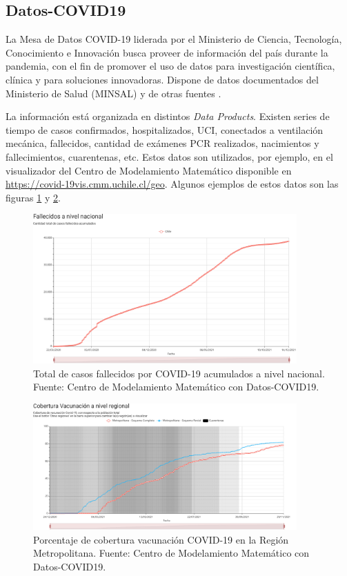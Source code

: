 \subsection{Datos-COVID19}\label{sec:datos-minsal}

La Mesa de Datos COVID-19 liderada por el Ministerio de Ciencia, Tecnología, Conocimiento e Innovación busca proveer de información del país durante la pandemia, con el fin de promover el uso de datos para investigación científica, clínica y para soluciones innovadoras. Dispone de datos documentados del Ministerio de Salud (MINSAL) y de otras fuentes \cite{MINCIENCIA}.

La información está organizada en distintos \textit{Data Products}. Existen series de tiempo de casos confirmados, hospitalizados, UCI, conectados a ventilación mecánica, fallecidos, cantidad de exámenes PCR realizados, nacimientos y fallecimientos, cuarentenas, etc. Estos datos son utilizados, por ejemplo, en el visualizador del Centro de Modelamiento Matemático disponible en \url{https://covid-19vis.cmm.uchile.cl/geo}. Algunos ejemplos de estos datos son las figuras \ref{img:cmm-fallecidos} y \ref{img:cmm-vacunados}.

\begin{figure}[H]
\centering
\includegraphics[width=0.9\textwidth]{img/metodologia/datos/fallecidos_nacional.png}
\caption{Total de casos fallecidos por COVID-19 acumulados a nivel nacional. Fuente: Centro de Modelamiento Matemático  con Datos-COVID19.}
\label{img:cmm-fallecidos}
\end{figure}

\begin{figure}[H]
\centering
\includegraphics[width=0.9\textwidth]{img/metodologia/datos/CoberturaVacunacionRM.png}
\caption{Porcentaje de cobertura vacunación COVID-19 en la Región Metropolitana. Fuente: Centro de Modelamiento Matemático con Datos-COVID19.}
\label{img:cmm-vacunados}
\end{figure}

